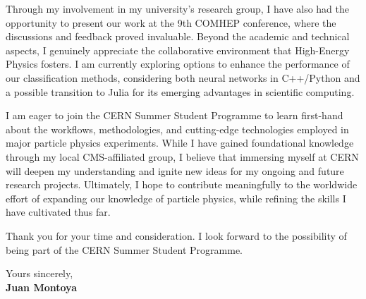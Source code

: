 \documentclass[11pt]{report}
\begin{document}
\begin{titlepage}
\vspace{0.7em}

Through my involvement in my university’s research group, I have also had the opportunity to present our work at the 9th COMHEP conference, where the discussions and feedback proved invaluable. Beyond the academic and technical aspects, I genuinely appreciate the collaborative environment that High-Energy Physics fosters. I am currently exploring options to enhance the performance of our classification methods, considering both neural networks in C++/Python and a possible transition to Julia for its emerging advantages in scientific computing.

\vspace{0.7em}

I am eager to join the CERN Summer Student Programme to learn first-hand about the workflows, methodologies, and cutting-edge technologies employed in major particle physics experiments. While I have gained foundational knowledge through my local CMS-affiliated group, I believe that immersing myself at CERN will deepen my understanding and ignite new ideas for my ongoing and future research projects. Ultimately, I hope to contribute meaningfully to the worldwide effort of expanding our knowledge of particle physics, while refining the skills I have cultivated thus far.

\vspace{0.7em}

Thank you for your time and consideration. I look forward to the possibility of being part of the CERN Summer Student Programme.

\vspace{0.7em}

\raggedright Yours sincerely,\\
\textbf{Juan Montoya}

\end{titlepage}
\end{document}
